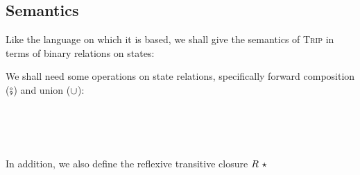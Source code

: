 \documentclass[sigplan]{acmart}%
\begin{document}
\subsection{Semantics}
Like the language on which it is based, we shall give the semantics of \textsc{Trip} 
in terms of binary relations on states:
\begin{code}
\>[2]\AgdaSpace{}%
\AgdaSymbol{=}\AgdaSpace{}%
\AgdaSpace{}%
\AgdaSpace{}%
\AgdaSpace{}%
\AgdaSpace{}%
\<%
\end{code}
We shall need some operations on state relations, specifically forward composition ($\AgdaFunction{\ensuremath\fatsemi}$) and 
union ($\AgdaFunction{\ensuremath{\cup}}$):
\begin{code}
\>[2]\AgdaSpace{}%
\AgdaSymbol{:}\AgdaSpace{}%
\AgdaSpace{}%
\AgdaSpace{}%
\AgdaSpace{}%
\AgdaSpace{}%
\<%
\\
%
\>[2]\AgdaSymbol{(}\AgdaSpace{}%
\AgdaSpace{}%
\AgdaSymbol{)}\AgdaSpace{}%
\AgdaSpace{}%
\AgdaSpace{}%
\AgdaSymbol{=}\AgdaSpace{}%
\AgdaFunction{∃[}\AgdaSpace{}%
\AgdaSpace{}%
\AgdaFunction{]}\AgdaSpace{}%
\AgdaSymbol{(}\AgdaSpace{}%
\AgdaSpace{}%
\AgdaSpace{}%
\AgdaSpace{}%
\AgdaSpace{}%
\AgdaSpace{}%
\AgdaSymbol{)}\<%
\\
%
\>[2]\AgdaSpace{}%
\AgdaSymbol{:}\AgdaSpace{}%
\AgdaSpace{}%
\AgdaSpace{}%
\AgdaSpace{}%
\AgdaSpace{}%
\<%
\\
%
\>[2]\AgdaSymbol{(}\AgdaSpace{}%
\AgdaSpace{}%
\AgdaSymbol{)}\AgdaSpace{}%
\AgdaSpace{}%
\AgdaSpace{}%
\AgdaSymbol{=}\AgdaSpace{}%
\AgdaSpace{}%
\AgdaSpace{}%
\AgdaSpace{}%
\AgdaSpace{}%
\AgdaSpace{}%
\AgdaSpace{}%
\<%
\end{code}
In addition, we also define the reflexive transitive closure $R\ \AgdaDatatype{\ensuremath{\star}}$ 
\end{document}
